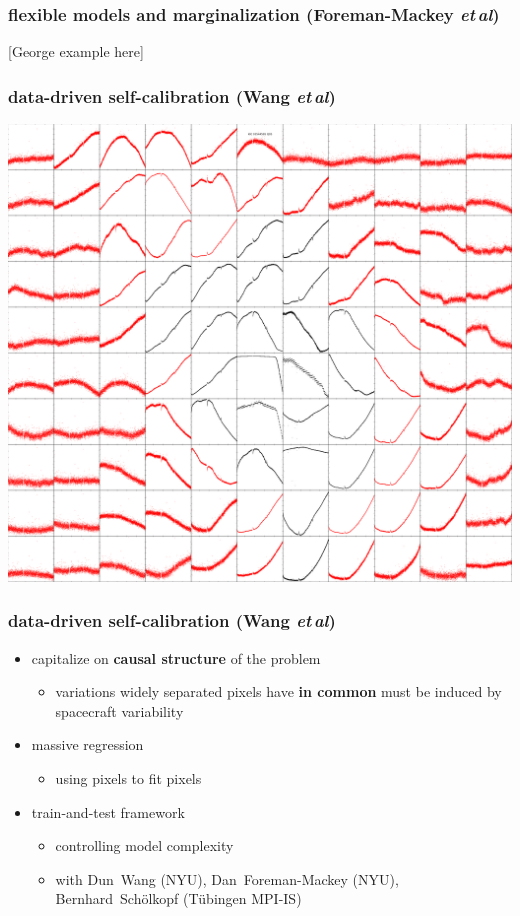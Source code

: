 \documentclass{beamer}
\newcommand{\foreign}[1]{\textsl{#1}}
\newcommand{\etal}{\foreign{et\,al}}
\renewcommand{\emph}[1]{\textbf{#1}}
\begin{document}
\begin{frame}
  \frametitle{flexible models and marginalization \small{(Foreman-Mackey \etal)}}
  [George example here]
\end{frame}

\begin{frame}
  \frametitle{data-driven self-calibration \small{(Wang \etal)}}
  \includegraphics[height=0.9\textheight]{kic_03544595_05_pixels.png}
\end{frame}

\begin{frame}
  \frametitle{data-driven self-calibration \small{(Wang \etal)}}
  \begin{itemize}
  \item capitalize on \emph{causal structure} of the problem
    \begin{itemize}
    \item variations widely separated pixels have \emph{in common} must be induced by spacecraft variability
    \end{itemize}
  \item massive regression
    \begin{itemize}
    \item using pixels to fit pixels
    \end{itemize}
  \item train-and-test framework
    \begin{itemize}
    \item controlling model complexity
    \item with Dun~Wang (NYU), Dan~Foreman-Mackey (NYU), Bernhard~Sch\"olkopf (T\"ubingen MPI-IS)
    \end{itemize}
  \end{itemize}
\end{frame}
\end{document}
